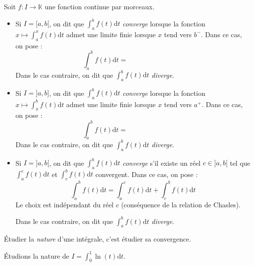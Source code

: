 \documentclass[french,11pt,twoside]{VcCours}
\newcommand{\dt}{\text{d}t}
\begin{document}
\begin{Definition}{} Soit $f : I \rightarrow \mathbb{K}$ une fonction continue par morceaux.

\begin{itemize}
\item Si $I=[a,b[$, on dit que $\int_a^b f(t)\dt$ \emph{converge} lorsque la fonction $x \mapsto \int_a^x f(t) \dt$ admet une limite finie lorsque $x$ tend vers $b^{-}$. Dans ce cas, on pose :
\[ \int_a^b f(t) \dt = \phantom{\lim_{x\to b^{-}} \int_a^x f(t)\dt} \]
Dans le cas contraire, on dit que $\int_a^b f(t)\dt$ \emph{diverge}.
\item Si $I=]a,b]$, on dit que $\int_a^b f(t)\dt$ \emph{converge} lorsque la fonction $x \mapsto \int_x^b f(t) \dt$ admet une limite finie lorsque $x$ tend vers $a^+$. Dans ce cas, on pose :
\[ \int_a^b f(t) \dt = \phantom{\lim_{x\to a^+} \int_x^b f(t)\dt} \]
Dans le cas contraire, on dit que $\int_a^b f(t)\dt$ \emph{diverge}.
\item Si $I=]a,b[$, on dit que $\int_a^b f(t)\dt$ \emph{converge} s'il existe un réel $c \in ]a,b[$ tel que $\int_a^c f(t)\dt$ et $\int_c^b f(t)\dt$ convergent. Dans ce cas, on pose :
$$ \int_a^b f(t)\dt = \int_a^c f(t)\dt + \int_c^b f(t)\dt $$
Le choix est indépendant du réel $c$ (conséquence de la relation de Chasles).

Dans le cas contraire, on dit que $\int_a^b f(t)\dt$ \emph{diverge}.
\end{itemize}
\end{Definition}

\begin{Remarque}{}
Étudier la \emph{nature} d'une intégrale, c'est étudier sa convergence.
\end{Remarque}

\begin{Exemple} Étudions la nature de $I=\int_{0}^1 \ln(t) \dt$.


\newpage
\end{Exemple}
\end{document}
